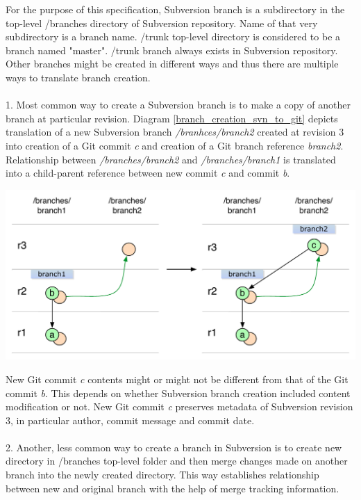 For the purpose of this specification, Subversion branch is a subdirectory in the top-level /branches directory of
Subversion repository. Name of that very subdirectory is a branch name. /trunk top-level directory is considered to be a branch named "master".
/trunk branch always exists in Subversion repository. Other branches might be created in different ways and thus there are 
multiple ways to translate branch creation.
\\\\
1. Most common way to create a Subversion branch is to make a copy of another branch at particular revision.
Diagram \ref{branch_creation_svn_to_git} depicts translation of a new Subversion branch \emph{/branhces/branch2} created 
at revision 3 into creation of a Git commit \emph{c} and creation of a Git branch reference \emph{branch2}. Relationship 
between \emph{/branches/branch2} and \emph{/branches/branch1} is translated into a child-parent reference between new commit \emph{c} and commit \emph{b}.
\begin{center}
\includegraphics[width=\textwidth]{img/diagrams/branch_creation_svn_to_git.pdf}%
\label{branch_creation_svn_to_git}%
\end{center}
New Git commit \emph{c} contents might or might not be different from that of the Git commit \emph{b}. 
This depends on whether Subversion branch creation included content modification or not. New Git commit
\emph{c} preserves metadata of Subversion revision 3, in particular author, commit message and commit date.
\\\\
2. Another, less common way to create a branch in Subversion is to create new directory in /branches top-level
folder and then merge changes made on another branch into the newly created directory. This way
establishes relationship between new and original branch with the help of merge tracking information.
